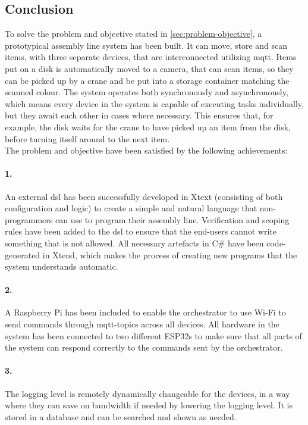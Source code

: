 \subsection{Conclusion}

To solve the problem and objective stated in \autoref{sec:problem-objective}, a prototypical assembly line system has been built. It can move, store and scan items, with three separate devices, that are interconnected utilizing \acrshort{mqtt}. Items put on a disk is automatically moved to a camera, that can scan items, so they can be picked up by a crane and be put into a storage container matching the scanned colour. The system operates both synchronously and asynchronously, which means every device in the system is capable of executing tasks individually, but they await each other in cases where necessary. This ensures that, for example, the disk waits for the crane to have picked up an item from the disk, before turning itself around to the next item.\\

The problem and objective have been satisfied by the following achievements:

\paragraph{1.} An external \acrshort{dsl} has been successfully developed in Xtext (consisting of both configuration and logic) to create a simple and natural language that non-programmers can use to program their assembly line. Verification and scoping rules have been added to the \acrshort{dsl} to ensure that the end-users cannot write something that is not allowed. All necessary artefacts in C\# have been code-generated in Xtend, which makes the process of creating new programs that the system understands automatic.

\paragraph{2. }A Raspberry Pi has been included to enable the orchestrator to use Wi-Fi to send commands through \acrshort{mqtt}-topics across all devices. All hardware in the system has been connected to two different ESP32s to make sure that all parts of the system can respond correctly to the commands sent by the orchestrator.

\paragraph{3.} The logging level is remotely dynamically changeable for the devices, in a way where they can save on bandwidth if needed by lowering the logging level. It is stored in a database and can be searched and shown as needed.

